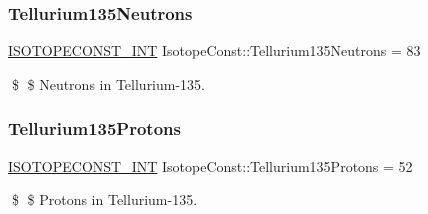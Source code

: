 \subsubsection{\texorpdfstring{Tellurium135\+Neutrons}{Tellurium135Neutrons}}
{\footnotesize\ttfamily \mbox{\hyperlink{group___isotope_const-_macros_ga5f18360b3e99483a35c32d789e62621c}{I\+S\+O\+T\+O\+P\+E\+C\+O\+N\+S\+T\+\_\+\+I\+NT}} Isotope\+Const\+::\+Tellurium135\+Neutrons = 83}

\$ \$ Neutrons in Tellurium-\/135. \mbox{\label{group___isotope_const-_tellurium-_te135_ga5f4db29a80cddfdfa717f71aa3cb665a}} 
\subsubsection{\texorpdfstring{Tellurium135\+Protons}{Tellurium135Protons}}
{\footnotesize\ttfamily \mbox{\hyperlink{group___isotope_const-_macros_ga5f18360b3e99483a35c32d789e62621c}{I\+S\+O\+T\+O\+P\+E\+C\+O\+N\+S\+T\+\_\+\+I\+NT}} Isotope\+Const\+::\+Tellurium135\+Protons = 52}

\$ \$ Protons in Tellurium-\/135. 